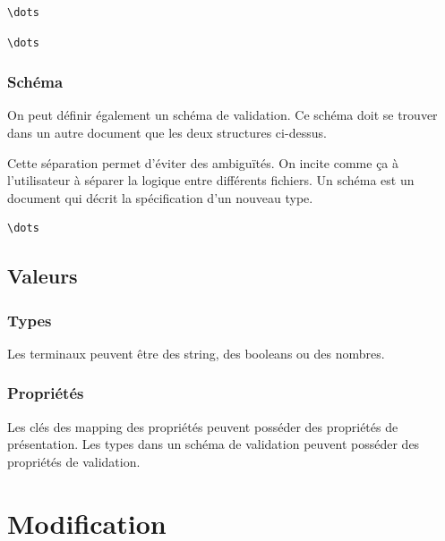 \documentclass[
    iict, %
    il, %
]{heig-tb}
\begin{document}

\begin{lstlisting}[frame=single,caption={json-seq},label={json-seq}]
\dots
\end{lstlisting}


\begin{lstlisting}[frame=single,caption={yaml-seq},label={yaml-seq}]
\dots
\end{lstlisting}


\subsubsection{Schéma}
On peut définir également un schéma de validation. Ce schéma doit se trouver dans un autre document que les deux structures ci-dessus.

Cette séparation permet d'éviter des ambiguïtés. On incite comme ça à l'utilisateur à séparer la logique entre différents fichiers.
Un schéma est un document qui décrit la spécification d'un nouveau type.

\begin{lstlisting}[frame=single,caption={yaml-seq},label={yaml-seq}]
    \dots
\end{lstlisting}

\subsection{Valeurs}

\subsubsection{Types}
Les terminaux peuvent être des string, des booleans ou des nombres.

\subsubsection{Propriétés}
Les clés des mapping des propriétés peuvent posséder des propriétés de présentation.
Les types dans un schéma de validation peuvent posséder des propriétés de validation.

\section{Modification}

\end{document}
